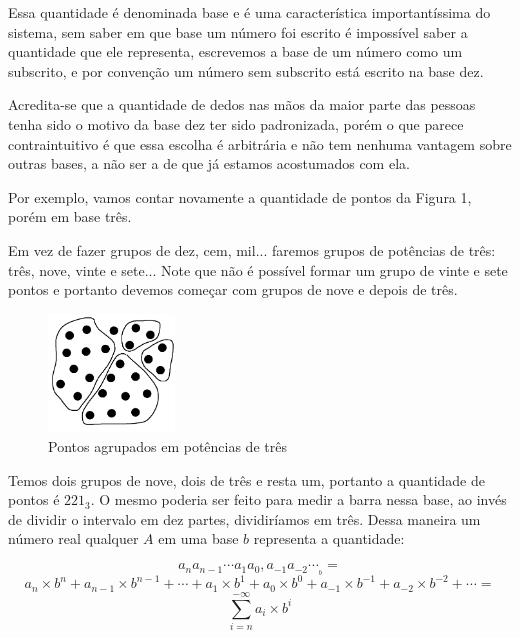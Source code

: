 \documentclass{report}
\theoremstyle{definition}
\begin{document}
Essa quantidade é denominada base e é uma característica importantíssima do sistema, sem saber em que base um número foi escrito é impossível saber a quantidade que ele representa, escrevemos a base de um número como um subscrito, e por convenção um número sem subscrito está escrito na base dez.

Acredita-se que a quantidade de dedos nas mãos da maior parte das pessoas tenha sido o motivo da base dez ter sido padronizada, porém o que parece contraintuitivo é que essa escolha é arbitrária e não tem nenhuma vantagem sobre outras bases, a não ser a de que já estamos acostumados com ela.

Por exemplo, vamos contar novamente a quantidade de pontos da Figura 1, porém em base três.

Em vez de fazer grupos de dez, cem, mil... faremos grupos de potências de três: três, nove, vinte e sete... Note que não é possível formar um grupo de vinte e sete pontos e portanto devemos começar com grupos de nove e depois de três.

\begin{figure}[H]
    \centering
    \includegraphics[width=0.3\textwidth]{imgs/pontosAgrupadosEm3.png}
    \caption{Pontos agrupados em potências de três}
\end{figure}

Temos dois grupos de nove, dois de três e resta um, portanto a quantidade de pontos é $221_3$. O mesmo poderia ser feito para medir a barra nessa base, ao invés de dividir o intervalo em dez partes, dividiríamos em três. Dessa maneira um número real qualquer $A$ em uma base $b$ representa a quantidade:

\begin{equation*}
a_n a_{n-1} \cdots a_1 a_0 , a_{-1} a_{-2} \cdots _{_b}=
\end{equation*}
\begin{equation*}
a_{n} \times b^{n} + a_{n-1} \times b^{n-1} + \cdots + a_{1} \times b^1 + a_{0} \times b^0 + a_{-1} \times b^{-1} + a_{-2} \times b^{-2} + \cdots=
\end{equation*}
\begin{equation} \label{eq:numeroReal}
\sum_{i=n}^{-\infty}a_i \times b^i
\end{equation}
\end{document}
